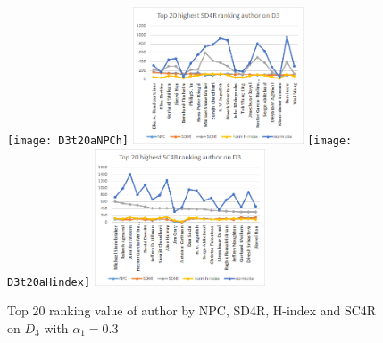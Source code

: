 \documentclass[10pt,leqno,twoside]{article}
\begin{document}
\begin{figure} %
	\caption{Top 20 ranking value of author by NPC, SD4R, H-index and SC4R on $D_3$ with $\alpha_1=0.3$}
	\label{Fig:Top20AuthorD3}
    \centering
    \texttt{[image: D3t20aNPCh]}    
    \includegraphics[width=0.45\textwidth]{D3t20aSD4Rh}
     \texttt{[image: D3t20aHindex]}
     \includegraphics[width=0.45\textwidth]{D3t20aSC4Rh}
\end{figure}


\end{document}
